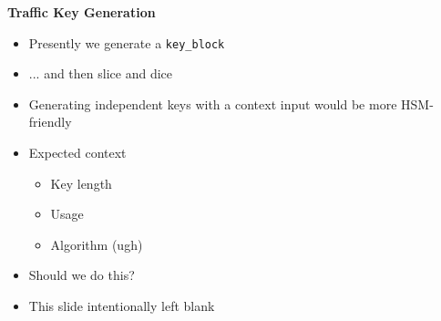 \documentclass[helvetica]{seminar}
\newcommand{\heading}[1]{%
  \begin{center} 
    \large\bf 
    #1 
  \end{center} 
  \vspace{.4 in}}
\begin{document}
\begin{slide}
\heading{Traffic Key Generation}

\begin{itemize}
\item Presently we generate a \verb^key_block^
\item ... and then slice and dice
\item Generating independent keys with a context input would be more HSM-friendly
\item Expected context
  \begin{itemize}
  \item Key length
  \item Usage
  \item Algorithm (ugh)
  \end{itemize}
\item Should we do this?
\end{itemize}
\end{slide}


\begin{itemize}
\item This slide intentionally left blank
\end{itemize}
\end{document}
